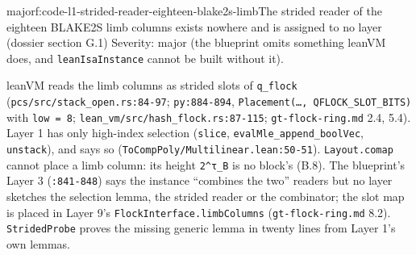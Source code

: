 \begin{finding}{major}{f:code-l1-strided-reader-eighteen-blake2s-limb}{The strided reader of the eighteen BLAKE2S limb columns exists nowhere and is assigned to no layer (dossier section G.1)}
Severity: major (the blueprint omits something leanVM does, and \texttt{leanIsaInstance} cannot be built without it).

leanVM reads the limb columns as strided slots of \texttt{q\_\allowbreak{}flock} (\texttt{pcs/\allowbreak{}src/\allowbreak{}stack\_\allowbreak{}open.\allowbreak{}rs:84-{}97}; \texttt{py:884-{}894}, \texttt{P\allowbreak{}l\allowbreak{}a\allowbreak{}c\allowbreak{}e\allowbreak{}m\allowbreak{}e\allowbreak{}n\allowbreak{}t\allowbreak{}(\allowbreak{}…\allowbreak{},\allowbreak{} Q\allowbreak{}F\allowbreak{}L\allowbreak{}O\allowbreak{}C\allowbreak{}K\allowbreak{}\_\allowbreak{}S\allowbreak{}L\allowbreak{}O\allowbreak{}T\allowbreak{}\_\allowbreak{}B\allowbreak{}I\allowbreak{}T\allowbreak{}S\allowbreak{})} with \texttt{low = 8}; \texttt{l\allowbreak{}e\allowbreak{}a\allowbreak{}n\allowbreak{}\_\allowbreak{}v\allowbreak{}m\allowbreak{}/\allowbreak{}s\allowbreak{}r\allowbreak{}c\allowbreak{}/\allowbreak{}h\allowbreak{}a\allowbreak{}s\allowbreak{}h\allowbreak{}\_\allowbreak{}f\allowbreak{}l\allowbreak{}o\allowbreak{}c\allowbreak{}k\allowbreak{}.\allowbreak{}r\allowbreak{}s\allowbreak{}:\allowbreak{}8\allowbreak{}7\allowbreak{}-{}\allowbreak{}1\allowbreak{}1\allowbreak{}5}; \texttt{gt-{}flock-{}ring.\allowbreak{}md} 2.4, 5.4). Layer 1 has only high-index selection (\texttt{slice}, \texttt{evalMle\_\allowbreak{}append\_\allowbreak{}boolVec}, \texttt{unstack}), and says so (\texttt{T\allowbreak{}o\allowbreak{}C\allowbreak{}o\allowbreak{}m\allowbreak{}p\allowbreak{}P\allowbreak{}o\allowbreak{}l\allowbreak{}y\allowbreak{}/\allowbreak{}M\allowbreak{}u\allowbreak{}l\allowbreak{}t\allowbreak{}i\allowbreak{}l\allowbreak{}i\allowbreak{}n\allowbreak{}e\allowbreak{}a\allowbreak{}r\allowbreak{}.\allowbreak{}l\allowbreak{}e\allowbreak{}a\allowbreak{}n\allowbreak{}:\allowbreak{}5\allowbreak{}0\allowbreak{}-{}\allowbreak{}5\allowbreak{}1}). \texttt{Layout.\allowbreak{}comap} cannot place a limb column: its height \texttt{2\textasciicircum{}τ\_\allowbreak{}B} is no block's (B.8). The blueprint's Layer 3 (\texttt{:841-{}848}) says the instance \enquote{combines the two} readers but no layer sketches the selection lemma, the strided reader or the combinator; the slot map is placed in Layer 9's \texttt{FlockInterface.\allowbreak{}limbColumns} (\texttt{gt-{}flock-{}ring.\allowbreak{}md} 8.2). \texttt{StridedProbe} proves the missing generic lemma in twenty lines from Layer 1's own lemmas.


\end{finding}
